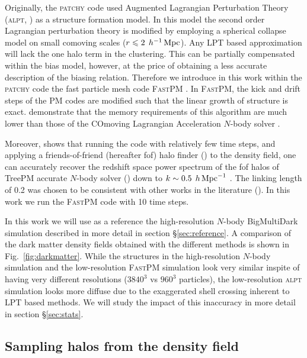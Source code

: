 \documentclass[english,usenatbib]{mn2e}
\newcommand{\mperh}{\,h^{-1}\,{\rm Mpc}}
\newcommand{\hperm}{\,h\,{\rm Mpc}^{-1}}
\begin{document}
Originally, the \textsc{patchy} code used Augmented Lagrangian Perturbation Theory (\textsc{alpt}, \citealt{alpt}) as a structure formation model. In this model the second order Lagrangian perturbation theory is modified by employing a spherical collapse model on small comoving scales ($r\leq 2\;\mperh$). 
Any LPT based approximation will lack the one halo term in the clustering. This can be partially compensated within the bias model, however, at the price of obtaining a less accurate description of the biasing relation.
Therefore we introduce in this work within the \textsc{patchy} code the fast particle mesh code \textsc{FastPM} \citep{fastpm}. 
In \textsc{FastPM}, the kick and drift steps of the PM codes are modified such that the linear growth of structure is exact. \citet{fastpm} demonstrate that the memory requirements of this algorithm are much lower than those of the COmoving Lagrangian Acceleration $N$-body solver \citep[\textsc{cola},][]{cola2013}. 

Moreover, \citet{fastpm} shows that running the code with relatively few time steps, and applying a friends-of-friend (hereafter fof) halo finder (\citealt{fof}) to the density field, one can accurately recover the redshift space power spectrum of the fof halos of TreePM accurate $N$-body solver (\citealt{treepm}) down to $k \sim 0.5 \; \hperm$ . The linking length of 0.2 was chosen to be consistent with other works in the literature (\citealt{cola2013}). In this work we run the \textsc{FastPM} code with 10 time steps. 

In this work we will use as a reference the high-resolution $N$-body BigMultiDark simulation described in more detail in section \S \ref{sec:reference}.
A comparison of the dark matter density fields obtained with the different methods is shown in Fig.~\ref{fig:darkmatter}. While the structures in the high-resolution $N$-body simulation and the low-resolution \textsc{FastPM} simulation look very similar inspite of having very different resolutions ($3840^3$ vs $960^3$ particles), the low-resolution \textsc{alpt} simulation looks more diffuse due to the exaggerated shell crossing inherent to LPT based methods. We will study the impact of this inaccuracy in more detail in section \S \ref{sec:stats}. 

\subsection{Sampling halos from the density field}
\label{sec:bias}
\end{document}
